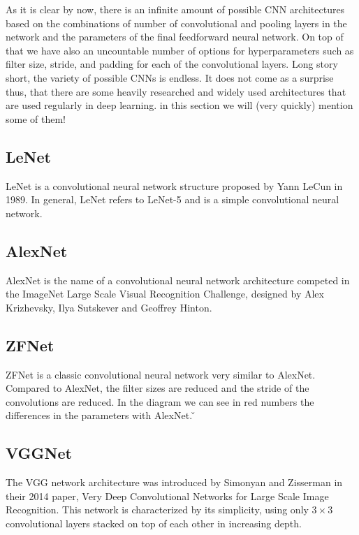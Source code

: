 As it is clear by now, there is an infinite amount of possible CNN architectures based on the combinations of number
of convolutional and pooling layers in the network and the parameters of the final feedforward neural network. On top
of that we have also an uncountable number of options for hyperparameters such as filter size, stride, and padding
for each of the convolutional layers. Long story short, the variety of possible CNNs is endless. It does not come as
a surprise thus, that there are some heavily researched and widely used architectures that are used regularly in deep
learning. in this section we will (very quickly) mention some of them!

\subsection*{LeNet}

LeNet is a convolutional neural network structure proposed by Yann LeCun in 1989. In general, LeNet refers to LeNet-5
and is a simple convolutional neural network.


\subsection*{AlexNet}

AlexNet is the name of a convolutional neural network architecture competed in the ImageNet Large Scale Visual
Recognition Challenge, designed by Alex Krizhevsky, Ilya Sutskever and Geoffrey Hinton.


\subsection*{ZFNet}

ZFNet is a classic convolutional neural network very similar to AlexNet. Compared to AlexNet, the filter sizes are
reduced and the stride of the convolutions are reduced. In the diagram we can see in red numbers the differences in
the parameters with AlexNet. \v


\subsection*{VGGNet}

The VGG network architecture was introduced by Simonyan and Zisserman in their 2014 paper, Very Deep Convolutional
Networks for Large Scale Image Recognition. This network is characterized by its simplicity, using only $3 \times 3$
convolutional layers stacked on top of each other in increasing depth.

